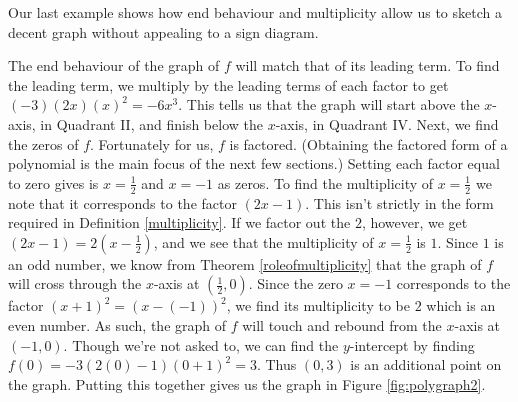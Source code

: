 \medskip

Our last example shows how end behaviour and multiplicity allow us to sketch a decent graph without appealing to a sign diagram.


{
The end behaviour of the graph of $f$ will match that of its leading term.  To find the leading term, we multiply by the leading terms of each factor to get $(-3)(2x)(x)^2 = -6x^3$.  This tells us that the graph will start above the $x$-axis, in Quadrant II, and finish below the $x$-axis, in Quadrant IV.  Next, we find the zeros of $f$.  Fortunately for us, $f$ is factored. (Obtaining the factored form of a polynomial is the main focus of the next few sections.)  Setting each factor equal to zero gives is $x = \frac{1}{2}$ and $x=-1$ as zeros. To find the multiplicity of $x=\frac{1}{2}$ we note that it corresponds to the factor $(2x-1)$.  This isn't strictly in the form required in Definition \ref{multiplicity}.  If we factor out the $2$, however, we get $(2x-1) = 2\left(x-\frac{1}{2}\right)$, and we see that the multiplicity of $x = \frac{1}{2}$ is $1$.  Since $1$ is an odd number, we know from Theorem \ref{roleofmultiplicity} that the graph of $f$ will cross through the $x$-axis at $\left(\frac{1}{2},0\right)$.   Since the zero $x=-1$ corresponds to the factor $(x+1)^2 = (x-(-1))^2$, we find its multiplicity to be $2$ which is an even number.  As such, the graph of $f$ will touch and rebound from the $x$-axis at $(-1,0)$.  Though we're not asked to, we can find the $y$-intercept by finding $f(0) = -3(2(0)-1)(0+1)^2 = 3$.  Thus  $(0,3)$ is an additional point on the graph.  Putting this together gives us the graph in Figure \ref{fig:polygraph2}.

}

